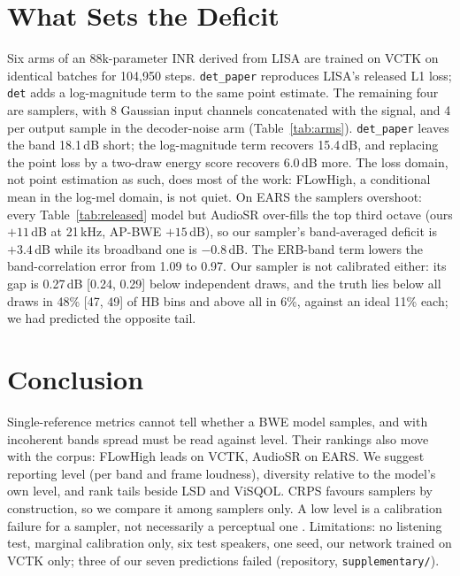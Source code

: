 \documentclass[letterpaper]{article} %
\begin{document}
\section{What Sets the Deficit}
Six arms of an 88k-parameter INR derived from LISA \citep{kim2022} are trained on VCTK on identical batches
for 104{,}950 steps. \texttt{det\_paper} reproduces LISA's released L1 loss; \texttt{det} adds a
log-magnitude term to the same point estimate. The remaining four are samplers, with 8 Gaussian input
channels concatenated with the signal, and 4 per output sample in the decoder-noise arm
(Table~\ref{tab:arms}). \texttt{det\_paper} leaves the band 18.1\,dB short; the log-magnitude term recovers
15.4\,dB, and replacing the point loss by a two-draw energy score \citep{gritsenko2020,bouchacourt2016}
recovers 6.0\,dB more. The loss domain, not point estimation as such, does most of the work: FLowHigh, a
conditional mean in the log-mel domain, is not quiet. On EARS the samplers overshoot: every Table~\ref{tab:released} model but
AudioSR over-fills the top third octave (ours $+11$\,dB at 21\,kHz, AP-BWE $+15$\,dB), so our sampler's
band-averaged deficit is $+3.4$\,dB while its broadband one is $-0.8$\,dB. The ERB-band term lowers the
band-correlation error from 1.09 to 0.97. Our sampler is not calibrated either: its gap is 0.27\,dB
[0.24, 0.29] below independent draws, and the truth lies below all draws in 48\% [47, 49] of HB bins and
above all in 6\%, against an ideal 11\% each; we had predicted the opposite tail.

\section{Conclusion}
Single-reference metrics cannot tell whether a BWE model samples, and with incoherent bands spread must be
read against level. Their rankings also move with the corpus: FLowHigh leads on VCTK, AudioSR on EARS. We
suggest reporting level (per band and frame loudness), diversity relative to the model's own level, and
rank tails beside LSD and ViSQOL. CRPS favours samplers by construction, so we compare it among samplers
only. A low level is a calibration failure for a sampler, not necessarily a perceptual one
\citep{nilsson2001}. Limitations: no listening test, marginal calibration only, six test speakers, one
seed, our network trained on VCTK only; three of our seven predictions failed (repository,
\texttt{supplementary/}).


\end{document}
